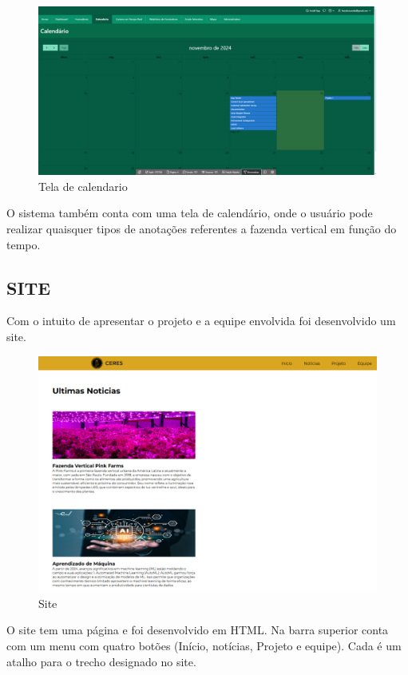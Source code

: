 \begin{figure}[!h]
\centering
\caption{Tela de calendario}
\label{fig:picture25}
\includegraphics[scale=0.2]{Illustrations/Tela_calendario.png}
\end{figure}
                
O sistema também conta com uma tela de calendário, onde o usuário pode realizar quaisquer tipos de anotações referentes a fazenda vertical em função do tempo.

\subsection*{SITE}

Com o intuito de apresentar o projeto e a equipe envolvida foi desenvolvido um site.

\begin{figure}[!h]
\centering
\caption{Site}
\label{fig:picture26}
\includegraphics[scale=0.5]{Illustrations/site.png}
\end{figure}
O site tem uma página e foi desenvolvido em HTML. Na barra superior conta com um menu com quatro botões (Início, notícias, Projeto e equipe). Cada é um atalho para o trecho designado no site. 